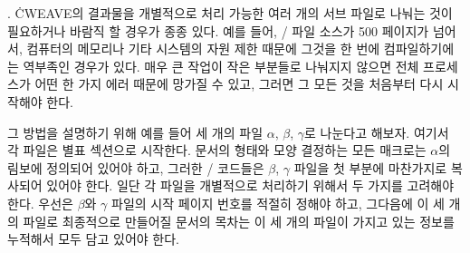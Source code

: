 {%
. \.{CWEAVE}의 결과물을 개별적으로 처리 가능한 여러 개의 서브
파일로 나눠는 것이 필요하거나 바람직 할 경우가 종종 있다.
예를 들어, \TEX/ 파일 소스가 500 페이지가 넘어서,
컴퓨터의 메모리나 기타 시스템의 자원 제한 때문에 그것을 한 번에 컴파일하기에는 역부족인 경우가
있다. 매우 큰 작업이 작은 부분들로 나눠지지 않으면 전체 프로세스가 어떤 한 가지 에러 때문에
망가질 수 있고, 그러면 그 모든 것을 처음부터 다시 시작해야 한다.

그 방법을 설명하기 위해 예를 들어 세 개의 파일 $\alpha$, $\beta$, $\gamma$로 나눈다고
해보자. 여기서 각 파일은 별표 섹션으로 시작한다. 문서의 형태와 모양 결정하는 모든 매크로는
$\alpha$의 림보에 정의되어 있어야 하고, 그러한 \TEX/ 코드들은 $\beta$, $\gamma$ 파일을
첫 부분에 마찬가지로 복사되어 있어야 한다. 일단 각 파일을 개별적으로 처리하기 위해서 두 가지를
고려해야 한다. 우선은 $\beta$와 $\gamma$ 파일의 시작 페이지 번호를 적절히 정해야 하고,
그다음에 이 세 개의 파일로 최종적으로 만들어질 문서의 목차는 이 세 개의 파일이 가지고 있는
정보를 누적해서 모두 담고 있어야 한다.

}
